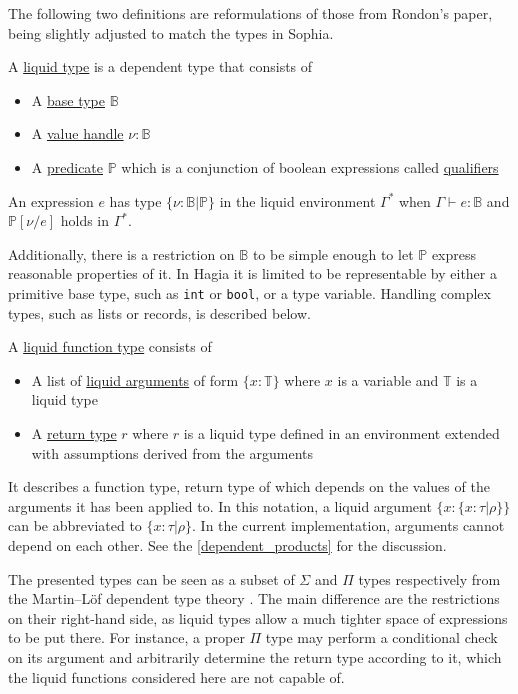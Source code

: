 The following two definitions are reformulations of those from Rondon's paper,
being slightly adjusted to match the types in Sophia.

\begin{defi}
  A \underline{liquid type} is a dependent type that consists of
  \begin{itemize}
  \item A \underline{base type} $\mathbb{B}$
  \item A \underline{value handle} $\nu : \mathbb{B}$
  \item A \underline{predicate} $\mathbb{P}$ which is a conjunction of boolean
    expressions called \underline{qualifiers}
  \end{itemize}
  An expression $e$ has type $\{\nu : \mathbb{B} | \mathbb{P}\}$ in the liquid
  environment $\Gamma^*$ when $\Gamma \vdash e : \mathbb{B}$ and
  $\mathbb{P}[\nu/e]$ holds in $\Gamma^*$.
\end{defi}

Additionally, there is a restriction on $\mathbb{B}$ to be simple enough to let
$\mathbb{P}$ express reasonable properties of it. In Hagia it is limited to be
representable by either a primitive base type, such as \texttt{int} or
\texttt{bool}, or a type variable. Handling complex types, such as lists or
records, is described below.

\begin{defi}
  A \underline{liquid function type} consists of
  \begin{itemize}
  \item A list of \underline{liquid arguments} of form $\{x : \mathbb{T}\}$
    where $x$ is a variable and $\mathbb{T}$ is a liquid type
  \item A \underline{return type} $r$ where $r$ is a liquid type defined in an
    environment extended with assumptions derived from the arguments
  \end{itemize}
  It describes a function type, return type of which depends on the values of
  the arguments it has been applied to. In this notation, a liquid argument $\{x
  : \{x : \tau | \rho\}\}$ can be abbreviated to $\{x : \tau | \rho\}$. In the
  current implementation, arguments cannot depend on each other. See the
  \autoref{dependent_products} for the discussion.
\end{defi}

The presented types can be seen as a subset of $\Sigma$ and $\Pi$ types
respectively from the Martin--Löf dependent type theory
\cite{Martin-Loef_anintuitionistic}. The main difference are the restrictions on
their right-hand side, as liquid types allow a much tighter space of expressions
to be put there. For instance, a proper $\Pi$ type may perform a conditional
check on its argument and arbitrarily determine the return type according to it,
which the liquid functions considered here are not capable of.

